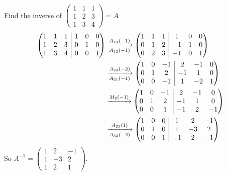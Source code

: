 \documentclass[10pt, a4paper]{article}
\begin{document}
\begin{example}
    Find the inverse of $\begin{pmatrix}
        1 & 1 & 1 \\
        1 & 2 & 3 \\
        1 & 3 & 4
    \end{pmatrix} = A$
    \begin{align*}
    \left(\hspace{-5pt}
    \begin{array}{ccc|ccc}
        1 & 1 & 1 & 1 & 0 & 0 \\
        1 & 2 & 3 & 0 & 1 & 0 \\
        1 & 3 & 4 & 0 & 0 & 1
    \end{array}
    \hspace{-5pt}\right)
    &\xrightarrow[A_{12}(-1)]{A_{13}(-1)}
    \left(\hspace{-5pt}
    \begin{array}{ccc|ccc}
        1 & 1 & 1 & 1 & 0 & 0 \\
        0 & 1 & 2 & -1 & 1 & 0 \\
        0 & 2 & 3 & -1 & 0 & 1
    \end{array}
    \hspace{-5pt}\right) \\
    &\xrightarrow[A_{21}(-1)]{A_{23}(-2)}
    \left(\hspace{-5pt}
    \begin{array}{ccc|ccc}
        1 & 0 & -1 & 2 & -1 & 0 \\
        0 & 1 & 2 & -1 & 1 & 0 \\
        0 & 0 & -1 & 1 & -2 & 1
    \end{array}
    \hspace{-5pt}\right) \\
    &\xrightarrow{M_{2}(-1)}
    \left(\hspace{-5pt}
    \begin{array}{ccc|ccc}
        1 & 0 & -1 & 2 & -1 & 0 \\
        0 & 1 & 2 & -1 & 1 & 0 \\
        0 & 0 & 1 & -1 & 2 & -1
    \end{array}
    \hspace{-5pt}\right) \\
    &\xrightarrow[A_{32}(-2)]{A_{21}(1)}
    \left(\hspace{-5pt}
    \begin{array}{ccc|ccc}
        1 & 0 & 0 & 1 & 2 & -1 \\
        0 & 1 & 0 & 1 & -3 & 2 \\
        0 & 0 & 1 & -1 & 2 & -1
    \end{array}
    \hspace{-5pt}\right)
    \end{align*}
    So $A ^ {-1} = \begin{pmatrix}
        1 & 2 & -1 \\
        1 & -3 & 2 \\
        1 & 2 & 1
    \end{pmatrix}$.
\end{example}
\end{document}
